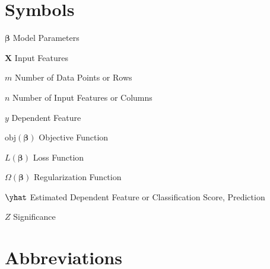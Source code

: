\abbreviations

\section*{Symbols}

\begin{symbollist}
	\item[$\bm{\beta}$] Model Parameters
	\item[$\mathbf{X}$] Input Features
	\item[$m$] Number of Data Points or Rows
	\item[$n$] Number of Input Features or Columns
	\item[$y$] Dependent Feature
	\item[$\text{obj}\left(\bm{\beta}\right)$] Objective Function
	\item[$L\left(\bm{\beta}\right)$] Loss Function
	\item[$\Omega\left(\bm{\beta}\right)$] Regularization Function
	\item[$\yhat$] Estimated Dependent Feature or Classification Score, Prediction
	\item[$Z$] Significance
\end{symbollist}

\section*{Abbreviations}

